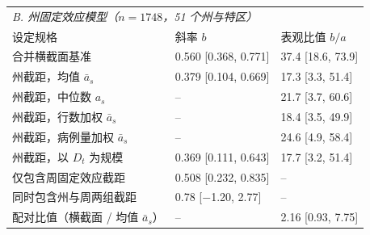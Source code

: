 \begin{table}[htbp]
\bigskip
\begin{tabular}{lll}
\toprule
\multicolumn{3}{l}{\textit{B. 州固定效应模型（$n=1748$，51 个州与特区）}}\\
设定规格 & 斜率 $b$ & 表观比值 $b/a$ \\
\midrule
合并横截面基准 & 0.560 [0.368, 0.771] & 37.4 [18.6, 73.9] \\
州截距，均值 $\bar{a}_s$ & 0.379 [0.104, 0.669] & 17.3 [3.3, 51.4] \\
州截距，中位数 $a_s$ & -- & 21.7 [3.7, 60.6] \\
州截距，行数加权 $\bar{a}_s$ & -- & 18.4 [3.5, 49.9] \\
州截距，病例量加权 $\bar{a}_s$ & -- & 24.6 [4.9, 58.4] \\
州截距，以 $D_t$ 为规模 & 0.369 [0.111, 0.643] & 17.7 [3.2, 51.4] \\
仅包含周固定效应截距 & 0.508 [0.232, 0.835] & -- \\
同时包含州与周两组截距 & 0.78 [$-$1.20, 2.77] & -- \\
配对比值（横截面 / 均值 $\bar{a}_s$） & -- & 2.16 [0.93, 7.75] \\
\bottomrule
\end{tabular}
\end{table}

